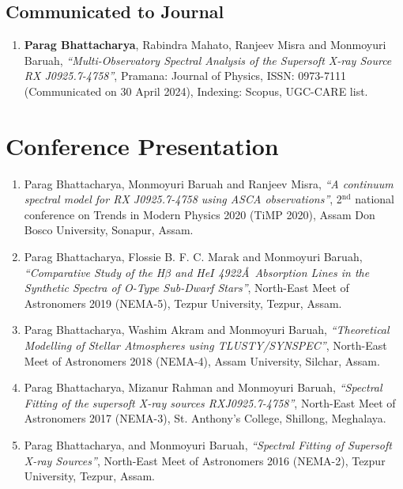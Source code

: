     	\subsection{Communicated to Journal}
    		\begin{enumerate}
    			\item \textbf{Parag Bhattacharya}, Rabindra Mahato, Ranjeev Misra and Monmoyuri Baruah, \textit{``Multi-Observatory Spectral Analysis of the Supersoft X-ray Source RX J0925.7-4758''}, Pramana: Journal of Physics, ISSN: 0973-7111 (Communicated on 30 April 2024), Indexing: Scopus, UGC-CARE list. \label{paper-pram}
    		\end{enumerate}
    
    \section{Conference Presentation}
        \begin{enumerate}
            \item Parag Bhattacharya, Monmoyuri Baruah and Ranjeev Misra, \textit{``A continuum spectral model for RX J0925.7-4758 using ASCA observations''}, 2$^{\text{nd}}$ national conference on Trends in Modern Physics 2020 (TiMP 2020), Assam Don Bosco University, Sonapur, Assam.
            
            \item Parag Bhattacharya, Flossie B. F. C. Marak and Monmoyuri Baruah, \textit{``Comparative Study of the H$\beta$ and He$I$ 4922\AA\ Absorption Lines in the Synthetic Spectra of O-Type Sub-Dwarf Stars''}, North-East Meet of Astronomers 2019 (NEMA-5), Tezpur University, Tezpur, Assam.
            
            \item Parag Bhattacharya, Washim Akram and Monmoyuri Baruah, \textit{``Theoretical Modelling of Stellar Atmospheres using TLUSTY/SYNSPEC''}, North-East Meet of Astronomers 2018 (NEMA-4), Assam University, Silchar, Assam.
            
            \item Parag Bhattacharya, Mizanur Rahman and Monmoyuri Baruah, \textit{``Spectral Fitting of the supersoft X-ray sources RXJ0925.7-4758''}, North-East Meet of Astronomers 2017 (NEMA-3), St. Anthony's College, Shillong, Meghalaya.
            
            \item Parag Bhattacharya, and Monmoyuri Baruah, \textit{``Spectral Fitting of Supersoft X-ray Sources''}, North-East Meet of Astronomers 2016 (NEMA-2), Tezpur University, Tezpur, Assam.
        \end{enumerate}
        
